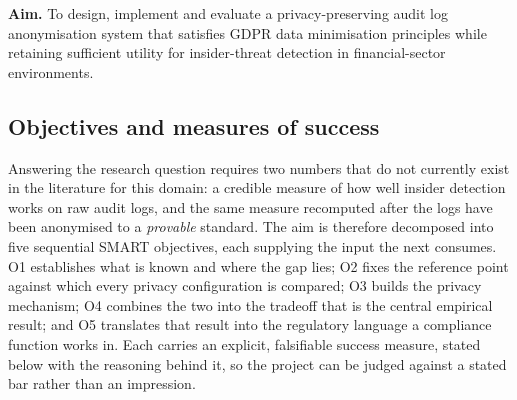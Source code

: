 \documentclass[10pt,a4paper]{article}
\begin{document}
\noindent\textbf{Aim.} To design, implement and evaluate a privacy-preserving audit log anonymisation system that satisfies GDPR data minimisation principles while retaining sufficient utility for insider-threat detection in financial-sector environments.

\subsection{Objectives and measures of success}
\label{sec:objectives}
Answering the research question requires two numbers that do not currently exist in the literature for this domain: a credible measure of how well insider detection works on raw audit logs, and the same measure recomputed after the logs have been anonymised to a \emph{provable} standard. The aim is therefore decomposed into five sequential SMART objectives, each supplying the input the next consumes. O1 establishes what is known and where the gap lies; O2 fixes the reference point against which every privacy configuration is compared; O3 builds the privacy mechanism; O4 combines the two into the tradeoff that is the central empirical result; and O5 translates that result into the regulatory language a compliance function works in. Each carries an explicit, falsifiable success measure, stated below with the reasoning behind it, so the project can be judged against a stated bar rather than an impression.
\end{document}
